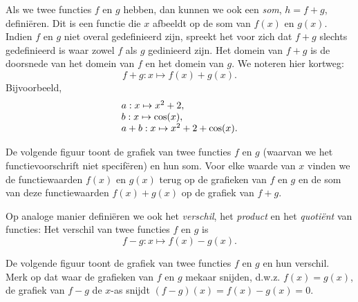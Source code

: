 \documentclass{ximera}
\begin{document}
Als we twee functies $f$ en $g$ hebben, dan kunnen we ook een {\em
  som}, $h=f+g$, defini\"eren. Dit is een functie die $x$ afbeeldt op
de som van $f(x)$ en $g(x)$. Indien $f$ en $g$ niet overal
gedefinieerd zijn, spreekt het voor zich dat $f+g$ slechts
gedefinieerd is waar zowel $f$ als $g$ gedinieerd zijn. Het domein van
$f+g$ is de doorsnede van het domein van $f$ en het domein van $g$.
We noteren hier kortweg:
\[
f+g:x\mapsto f(x)+g(x).
\]
Bijvoorbeeld,
\[
\ba{l}
a:x\mapsto x^2+2,\\
b:x\mapsto \cos(x),\\
a+b:x\mapsto x^2+2+\cos(x).
\ea
\]

\newpage

De volgende figuur toont de grafiek van twee functies $f$ en $g$ (waarvan we
het functievoorschrift niet specif\"eren) en hun som. Voor elke waarde
van $x$ vinden we de functiewaarden $f(x)$ en $g(x)$ terug op de
grafieken van $f$ en $g$ en de som van deze functiewaarden $f(x)+g(x)$
op de grafiek van $f+g$.

\begin{center}
\end{center}

Op analoge manier defini\"eren we ook het {\em verschil}, het {\em
  product} en het {\em quoti\"ent} van functies:
Het verschil van twee functies $f$ en $g$ is
\[
f-g:x\mapsto f(x)-g(x).
\]

De volgende figuur toont de grafiek van twee functies $f$ en $g$
en hun verschil. Merk op dat waar de grafieken van $f$ en $g$ mekaar
snijden, d.w.z. $f(x)=g(x)$, de grafiek van $f-g$ de $x$-as snijdt
$(f-g)(x)=f(x)-g(x)=0$.
\end{document}
